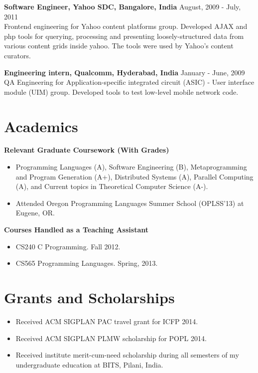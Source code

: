 \documentclass[margin,line]{res}
\begin{document}
\begin{resume}
{\bf Software Engineer, Yahoo SDC, Bangalore, India} \hfill August, 2009 -
July, 2011\\
Frontend engineering for Yahoo content platforms group. Developed AJAX
and php tools for querying, processing and presenting
loosely-structured data from various content grids inside yahoo. The
tools were used by Yahoo's content curators.

{\bf Engineering intern, Qualcomm, Hyderabad, India} \hfill January - June, 2009\\
QA Engineering for Application-specific integrated circuit (ASIC) -
User interface module (UIM) group. Developed tools to test low-level
mobile network code.\\

\section{Academics}
{\bf Relevant Graduate Coursework (With Grades)}\\
\begin{itemize}
\item Programming Languages (A), Software Engineering (B),
Metaprogramming and Program Generation (A+), Distributed Systems (A),
Parallel Computing (A), and Current topics in Theoretical Computer
Science (A-).  
\item Attended Oregon Programming Languages Summer School (OPLSS'13)
at Eugene, OR.
\end{itemize}

{\bf Courses Handled as a Teaching Assistant}\\
\begin{itemize}
\item CS240 C Programming. Fall 2012.
\item CS565 Programming Languages. Spring, 2013.
\end{itemize}

\section{Grants and Scholarships}
\begin{itemize}
\item Received ACM SIGPLAN PAC travel grant for ICFP 2014.
\item Received ACM SIGPLAN PLMW scholarship for POPL 2014.
\item Received institute merit-cum-need scholarship during all 
semesters of my undergraduate education at BITS, Pilani, India.
\end{itemize}


\end{resume}
\end{document}
